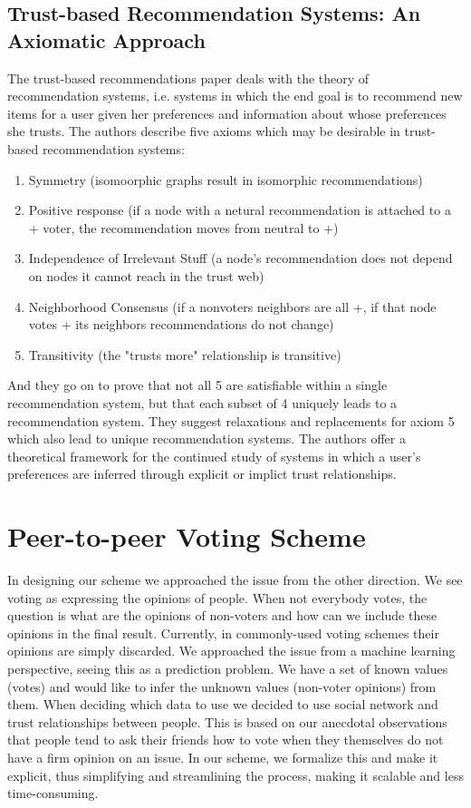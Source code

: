 \documentclass[a4paper]{acm_proc_article-sp}
\begin{document}
\subsection{Trust-based Recommendation Systems: An Axiomatic Approach}

The trust-based recommendations paper \cite{axioms} deals with the theory of recommendation systems, i.e. systems in which the end goal is to recommend new items for a user given her preferences and information about whose preferences she trusts.  The authors describe five axioms which may be desirable in trust-based recommendation systems:
\begin{enumerate}
	\item Symmetry (isomoorphic graphs result in isomorphic recommendations)
	\item Positive response (if a node with a netural recommendation is attached to a + voter, the recommendation moves from neutral to +)
	\item Independence of Irrelevant Stuff (a node's recommendation does not depend on nodes it cannot reach in the trust web)
	\item Neighborhood Consensus (if a nonvoters neighbors are all +, if that node votes + its neighbors recommendations do not change)
	\item Transitivity (the "trusts more" relationship is transitive)
\end{enumerate}
And they go on to prove that not all 5 are satisfiable within a single recommendation system, but that each subset of 4 uniquely leads to a recommendation system.  They suggest relaxations and replacements for axiom 5 which also lead to unique recommendation systems.  The authors offer a theoretical framework for the continued study of systems in which a user's preferences are inferred through explicit or implict trust relationships.

\section{Peer-to-peer Voting Scheme}

In designing our scheme we approached the issue from the other direction. We see voting as expressing the opinions of
people. When not everybody votes, the question is what are the opinions of non-voters and how can we include
these opinions in the final result. Currently, in commonly-used voting schemes their opinions are simply discarded.
We approached the issue from a machine learning perspective, seeing this as a prediction problem. We have a set
of known values (votes) and would like to infer the unknown values (non-voter opinions) from them. When deciding which data to
use we decided to use social network and trust relationships between people.  This is based on our anecdotal observations that
people tend to ask their friends how to vote when they themselves do not have a firm opinion on an issue. In our scheme,
we formalize this and make it explicit, thus simplifying and streamlining the process, making it scalable and
less time-consuming.
\end{document}
